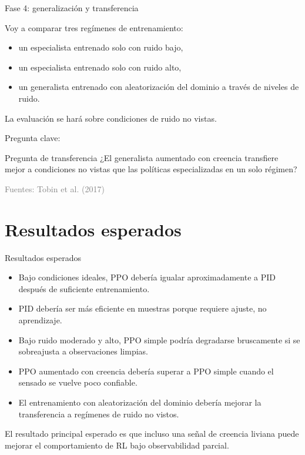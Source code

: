 \documentclass[11pt]{beamer}
\newcommand{\srcTobin}{Tobin et al. (2017)}
\newcommand{\SourceLine}[1]{\vfill{\tiny\textcolor{gray}{Fuentes: #1}}}
\begin{document}

\begin{frame}{Fase 4: generalización y transferencia}

Voy a comparar tres regímenes de entrenamiento:
\begin{itemize}
  \item un especialista entrenado solo con ruido bajo,
  \item un especialista entrenado solo con ruido alto,
  \item un generalista entrenado con aleatorización del dominio a través de niveles de ruido.
\end{itemize}

\medskip
La evaluación se hará sobre condiciones de ruido no vistas.

\medskip
Pregunta clave:
\begin{block}{Pregunta de transferencia}
¿El generalista aumentado con creencia transfiere mejor a condiciones no vistas que las políticas especializadas en un solo régimen?
\end{block}

\SourceLine{\srcTobin}
\end{frame}


\section{Resultados esperados}


\begin{frame}{Resultados esperados}

\begin{itemize}
  \item Bajo condiciones ideales, PPO debería igualar aproximadamente a PID después de suficiente entrenamiento.
  \item PID debería ser más eficiente en muestras porque requiere ajuste, no aprendizaje.
  \item Bajo ruido moderado y alto, PPO simple podría degradarse bruscamente si se sobreajusta a observaciones limpias.
  \item PPO aumentado con creencia debería superar a PPO simple cuando el sensado se vuelve poco confiable.
  \item El entrenamiento con aleatorización del dominio debería mejorar la transferencia a regímenes de ruido no vistos.
\end{itemize}

\medskip
El resultado principal esperado es que incluso una señal de creencia liviana puede mejorar el comportamiento de RL bajo observabilidad parcial.
\end{frame}
\end{document}
